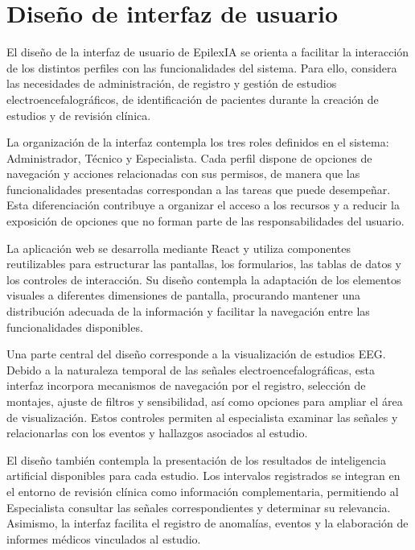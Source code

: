 \section{Diseño de interfaz de usuario}
\label{sec:diseno-interfaz-usuario}

El diseño de la interfaz de usuario de EpilexIA se orienta a facilitar la interacción de los distintos perfiles con las funcionalidades del sistema. Para ello, considera las necesidades de administración, de registro y gestión de estudios electroencefalográficos, de identificación de pacientes durante la creación de estudios y de revisión clínica.

La organización de la interfaz contempla los tres
roles definidos en el sistema: Administrador, Técnico
y Especialista. Cada perfil dispone de opciones de
navegación y acciones relacionadas con sus permisos,
de manera que las funcionalidades presentadas
correspondan a las tareas que puede desempeñar.
Esta diferenciación contribuye a organizar el acceso
a los recursos y a reducir la exposición de opciones
que no forman parte de las responsabilidades del
usuario.

La aplicación web se desarrolla mediante React y
utiliza componentes reutilizables para estructurar
las pantallas, los formularios, las tablas de datos
y los controles de interacción. Su diseño contempla
la adaptación de los elementos visuales a diferentes
dimensiones de pantalla, procurando mantener una
distribución adecuada de la información y facilitar
la navegación entre las funcionalidades disponibles.

Una parte central del diseño corresponde a la
visualización de estudios EEG. Debido a la naturaleza
temporal de las señales electroencefalográficas,
esta interfaz incorpora mecanismos de navegación
por el registro, selección de montajes, ajuste de
filtros y sensibilidad, así como opciones para ampliar
el área de visualización. Estos controles permiten
al especialista examinar las señales y relacionarlas
con los eventos y hallazgos asociados al estudio.


El diseño también contempla la presentación de los resultados de inteligencia artificial disponibles para cada estudio. Los intervalos registrados se integran en el entorno de revisión clínica como información complementaria, permitiendo al Especialista consultar las señales correspondientes y determinar su relevancia. Asimismo, la interfaz facilita el registro de anomalías, eventos y la elaboración de informes médicos vinculados al estudio.



